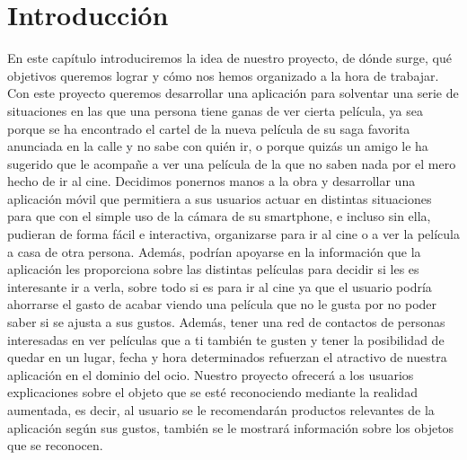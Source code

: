 
\cleardoublepage


\chapter{Introducción}
\label{makereference}


    En este capítulo introduciremos la idea de nuestro proyecto, de dónde surge, qué objetivos queremos lograr y cómo nos hemos organizado a la hora de trabajar.
    Con este proyecto queremos desarrollar una aplicación para solventar una serie de situaciones en las que una persona
    tiene ganas de ver cierta película, ya sea porque se ha encontrado el cartel de la nueva película
    de su saga favorita anunciada en la calle y no sabe con quién ir, o porque quizás un amigo le ha sugerido que le acompañe
    a ver una película de la que no saben nada por el mero hecho de ir al cine. 
    Decidimos ponernos manos a la obra y desarrollar una aplicación móvil que permitiera a sus usuarios actuar en distintas situaciones
    para que con el simple uso de la cámara de su smartphone, e incluso sin ella, pudieran de forma
    fácil e interactiva, organizarse para ir al cine o a ver la película a casa de otra persona. Además, podrían apoyarse en la 
    información que la aplicación les proporciona sobre las distintas películas para decidir si les es interesante ir a verla, sobre todo 
    si es para ir al cine ya que el usuario podría ahorrarse el gasto de acabar viendo una película que no le gusta por no poder saber si se 
    ajusta a sus gustos. Además, tener una red de contactos de personas interesadas en ver películas que a ti también te gusten y tener la posibilidad
    de quedar en un lugar, fecha y hora determinados refuerzan el atractivo de nuestra aplicación en el dominio del ocio.
    Nuestro proyecto ofrecerá a los usuarios explicaciones sobre el objeto que se esté reconociendo mediante la realidad aumentada, es decir, al usuario se le 
    recomendarán productos relevantes de la aplicación según sus gustos, también se le mostrará información sobre los objetos que se reconocen.


